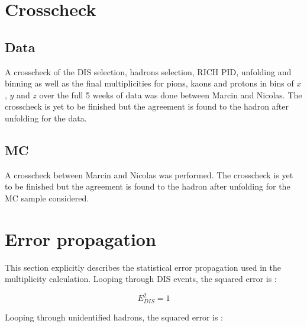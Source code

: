 \documentclass[letterpaper,12pt]{article}
\begin{document}
\appendix

\section{Crosscheck} \label{XC}

\subsection{Data}

A crosscheck of the DIS selection, hadrons selection, RICH PID, unfolding and binning as well as the final multiplicities for pions, kaons and protons in bins of $x$, $y$ and $z$ over the full 5 weeks of data was done between Marcin and Nicolas. The crosscheck is yet to be finished but the agreement is found to the hadron after unfolding for the data.



\subsection{MC}

A crosscheck between Marcin and Nicolas was performed. The crosscheck is yet to be finished but the agreement is found to the hadron after unfolding for the MC sample considered.

\section{Error propagation} \label{Eprop}

This section explicitly describes the statistical error propagation used in the multiplicity calculation. Looping through DIS events, the squared error is :

\begin{equation}
		E^2_{DIS} = 1
\end{equation}

Looping through unidentified hadrons, the squared error is :
\end{document}
